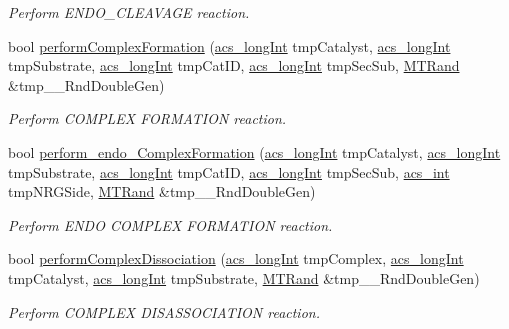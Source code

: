 \begin{DoxyCompactItemize}
\begin{DoxyCompactList}\small\item\em Perform E\-N\-D\-O\-\_\-\-C\-L\-E\-A\-V\-A\-G\-E reaction. \end{DoxyCompactList}\item 
bool \hyperlink{a00011_aaf4f4f6be28edb182d2a2516c9394f9b}{perform\-Complex\-Formation} (\hyperlink{a00024_a19319d75f02db4308bc5c0026d98cd85}{acs\-\_\-long\-Int} tmp\-Catalyst, \hyperlink{a00024_a19319d75f02db4308bc5c0026d98cd85}{acs\-\_\-long\-Int} tmp\-Substrate, \hyperlink{a00024_a19319d75f02db4308bc5c0026d98cd85}{acs\-\_\-long\-Int} tmp\-Cat\-I\-D, \hyperlink{a00024_a19319d75f02db4308bc5c0026d98cd85}{acs\-\_\-long\-Int} tmp\-Sec\-Sub, \hyperlink{a00016}{M\-T\-Rand} \&tmp\-\_\-\-\_\-\-Rnd\-Double\-Gen)
\begin{DoxyCompactList}\small\item\em Perform C\-O\-M\-P\-L\-E\-X F\-O\-R\-M\-A\-T\-I\-O\-N reaction. \end{DoxyCompactList}\item 
bool \hyperlink{a00011_ae942db2453c56b60250a5d43452b91a5}{perform\-\_\-endo\-\_\-\-Complex\-Formation} (\hyperlink{a00024_a19319d75f02db4308bc5c0026d98cd85}{acs\-\_\-long\-Int} tmp\-Catalyst, \hyperlink{a00024_a19319d75f02db4308bc5c0026d98cd85}{acs\-\_\-long\-Int} tmp\-Substrate, \hyperlink{a00024_a19319d75f02db4308bc5c0026d98cd85}{acs\-\_\-long\-Int} tmp\-Cat\-I\-D, \hyperlink{a00024_a19319d75f02db4308bc5c0026d98cd85}{acs\-\_\-long\-Int} tmp\-Sec\-Sub, \hyperlink{a00024_a8d277355641a098190360234e2ebde35}{acs\-\_\-int} tmp\-N\-R\-G\-Side, \hyperlink{a00016}{M\-T\-Rand} \&tmp\-\_\-\-\_\-\-Rnd\-Double\-Gen)
\begin{DoxyCompactList}\small\item\em Perform E\-N\-D\-O C\-O\-M\-P\-L\-E\-X F\-O\-R\-M\-A\-T\-I\-O\-N reaction. \end{DoxyCompactList}\item 
bool \hyperlink{a00011_a5c5e57b0558067cbf55c894f33d0a121}{perform\-Complex\-Dissociation} (\hyperlink{a00024_a19319d75f02db4308bc5c0026d98cd85}{acs\-\_\-long\-Int} tmp\-Complex, \hyperlink{a00024_a19319d75f02db4308bc5c0026d98cd85}{acs\-\_\-long\-Int} tmp\-Catalyst, \hyperlink{a00024_a19319d75f02db4308bc5c0026d98cd85}{acs\-\_\-long\-Int} tmp\-Substrate, \hyperlink{a00016}{M\-T\-Rand} \&tmp\-\_\-\-\_\-\-Rnd\-Double\-Gen)
\begin{DoxyCompactList}\small\item\em Perform C\-O\-M\-P\-L\-E\-X D\-I\-S\-A\-S\-S\-O\-C\-I\-A\-T\-I\-O\-N reaction. \end{DoxyCompactList}\item 

\end{DoxyCompactItemize}

